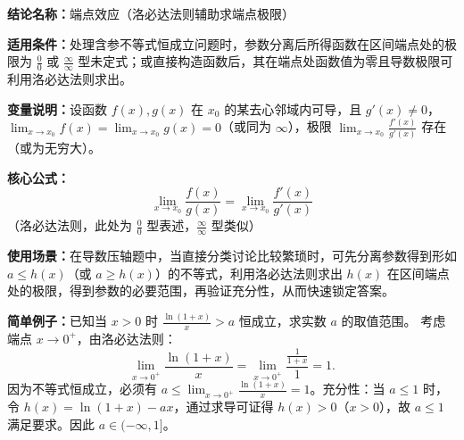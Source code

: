 \textbf{结论名称：}端点效应（洛必达法则辅助求端点极限）

\textbf{适用条件：}处理含参不等式恒成立问题时，参数分离后所得函数在区间端点处的极限为 \(\frac{0}{0}\) 或 \(\frac{\infty}{\infty}\) 型未定式；或直接构造函数后，其在端点处函数值为零且导数极限可利用洛必达法则求出。

\textbf{变量说明：}设函数 \(f(x),g(x)\) 在 \(x_0\) 的某去心邻域内可导，且 \(g'(x)\neq 0\)，\(\lim_{x\to x_0}f(x)=\lim_{x\to x_0}g(x)=0\)（或同为 \(\infty\)），极限 \(\displaystyle\lim_{x\to x_0}\frac{f'(x)}{g'(x)}\) 存在（或为无穷大）。

\textbf{核心公式：}
\[
\boxed{\lim_{x\to x_0}\frac{f(x)}{g(x)}=\lim_{x\to x_0}\frac{f'(x)}{g'(x)}}
\]
（洛必达法则，此处为 \(\frac{0}{0}\) 型表述，\(\frac{\infty}{\infty}\) 型类似）

\textbf{使用场景：}在导数压轴题中，当直接分类讨论比较繁琐时，可先分离参数得到形如 \(a\le h(x)\)（或 \(a\ge h(x)\)）的不等式，利用洛必达法则求出 \(h(x)\) 在区间端点处的极限，得到参数的必要范围，再验证充分性，从而快速锁定答案。

\textbf{简单例子：}已知当 \(x>0\) 时 \(\displaystyle\frac{\ln(1+x)}{x}>a\) 恒成立，求实数 \(a\) 的取值范围。
考虑端点 \(x\to 0^{+}\)，由洛必达法则：
\[
\lim_{x\to 0^{+}}\frac{\ln(1+x)}{x} = \lim_{x\to 0^{+}}\frac{\frac{1}{1+x}}{1}=1.
\]
因为不等式恒成立，必须有 \(a\le \lim_{x\to 0^{+}}\frac{\ln(1+x)}{x}=1\)。充分性：当 \(a\le 1\) 时，令 \(h(x)=\ln(1+x)-ax\)，通过求导可证得 \(h(x)>0\)（\(x>0\)），故 \(a\le 1\) 满足要求。因此 \(a \in (-\infty,1]\)。
